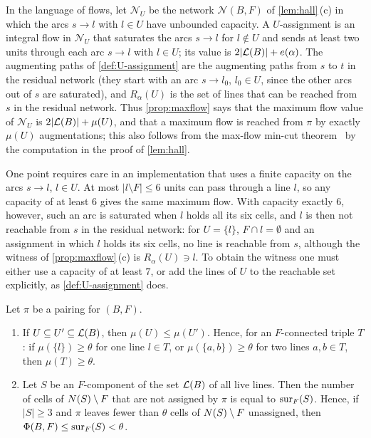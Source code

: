 \begin{remark}[Flows]\label{rem:flow}
In the language of flows, let $\mathcal N_U$ be the network $\mathcal N(B,F)$ of \cref{lem:hall}\,(c) in
which the arcs $s\to l$ with $l\in U$ have unbounded capacity. A $U$-assignment is an integral flow in
$\mathcal N_U$ that saturates the arcs $s\to l$ for $l\notin U$ and sends at least two units through
each arc $s\to l$ with $l\in U$; its value is $2|\mathcal{L}(B)|+e(\alpha)$. The
augmenting paths of \cref{def:U-assignment} are the augmenting paths from $s$ to $t$ in the residual
network (they start with an arc $s\to l_0$, $l_0\in U$, since the other arcs out of $s$ are saturated),
and $R_\alpha(U)$ is the set of lines that can be reached from $s$ in the residual network. Thus
\cref{prop:maxflow} says that the maximum flow value of $\mathcal N_U$ is $2|\mathcal{L}(B)|+\mu(U)$, and that
a maximum flow is reached from $\pi$ by exactly $\mu(U)$ augmentations; this also follows from the
max-flow min-cut theorem~\cite{FordFulkerson1962} by the computation in the proof of \cref{lem:hall}.

One point requires care in an implementation that uses a finite capacity on the arcs $s\to l$, $l\in U$.
At most $|l\setminus F|\le 6$ units can pass through a line $l$, so any capacity of at least $6$ gives
the same maximum flow. With capacity exactly $6$, however, such an arc is saturated when $l$ holds all its six
cells, and $l$ is then not reachable from $s$ in the residual network: for $U=\{l\}$, $F\cap
l=\emptyset$ and an assignment in which $l$ holds its six cells, no line is reachable from $s$, although
the witness of \cref{prop:maxflow}\,(c) is $R_\alpha(U)\ni l$. To obtain the witness one must either use a
capacity of at least $7$, or add the lines of $U$ to the reachable set explicitly, as
\cref{def:U-assignment} does.
\end{remark}

\begin{corollary}\label{cor:pruning}
Let $\pi$ be a pairing for $(B,F)$.
\begin{enumerate}[label=\textup{(\alph*)}]
\item If $U\subseteq U'\subseteq\mathcal{L}(B)$, then $\mu(U)\le\mu(U')$. Hence, for an $F$-connected triple $T$:
      if $\mu(\{l\})\ge\theta$ for one line $l\in T$, or $\mu(\{a,b\})\ge\theta$ for two lines $a,b\in T$,
      then $\mu(T)\ge\theta$.
\item Let $S$ be an $F$-component of the set $\mathcal{L}(B)$ of all live lines. Then the number of cells of
      $N(S)\setminus F$ that are not assigned by $\pi$ is equal to $\operatorname{sur}_F(S)$. Hence, if $|S|\ge 3$ and
      $\pi$ leaves fewer than $\theta$ cells of $N(S)\setminus F$ unassigned, then
      $\Phi(B,F)\le\operatorname{sur}_F(S)<\theta$.
\end{enumerate}
\end{corollary}

